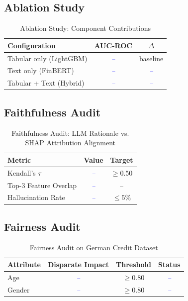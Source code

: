\documentclass[preprint,12pt]{elsarticle}
\newcommand{\PLACEHOLDER}[1]{\textcolor{blue}{\textit{#1}}}
\begin{document}
\subsection{Ablation Study}

\begin{table}[h]
\centering
\caption{Ablation Study: Component Contributions}
\label{tab:ablation}
\begin{tabular}{lcc}
\toprule
\textbf{Configuration} & \textbf{AUC-ROC} & \textbf{$\Delta$} \\
\midrule
Tabular only (LightGBM) & \PLACEHOLDER{--} & baseline \\
Text only (FinBERT)      & \PLACEHOLDER{--} & \PLACEHOLDER{--} \\
Tabular + Text (Hybrid)  & \PLACEHOLDER{--} & \PLACEHOLDER{--} \\
\bottomrule
\end{tabular}
\end{table}

\subsection{Faithfulness Audit}

\begin{table}[h]
\centering
\caption{Faithfulness Audit: LLM Rationale vs. SHAP Attribution Alignment}
\label{tab:faithfulness}
\begin{tabular}{lcc}
\toprule
\textbf{Metric} & \textbf{Value} & \textbf{Target} \\
\midrule
Kendall's $\tau$       & \PLACEHOLDER{--} & $\geq 0.50$ \\
Top-3 Feature Overlap  & \PLACEHOLDER{--} & -- \\
Hallucination Rate     & \PLACEHOLDER{--} & $\leq 5\%$ \\
\bottomrule
\end{tabular}
\end{table}

\subsection{Fairness Audit}

\begin{table}[h]
\centering
\caption{Fairness Audit on German Credit Dataset}
\label{tab:fairness}
\begin{tabular}{lccc}
\toprule
\textbf{Attribute} & \textbf{Disparate Impact} & \textbf{Threshold} & \textbf{Status} \\
\midrule
Age    & \PLACEHOLDER{--} & $\geq 0.80$ & \PLACEHOLDER{--} \\
Gender & \PLACEHOLDER{--} & $\geq 0.80$ & \PLACEHOLDER{--} \\
\bottomrule
\end{tabular}
\end{table}
\end{document}
